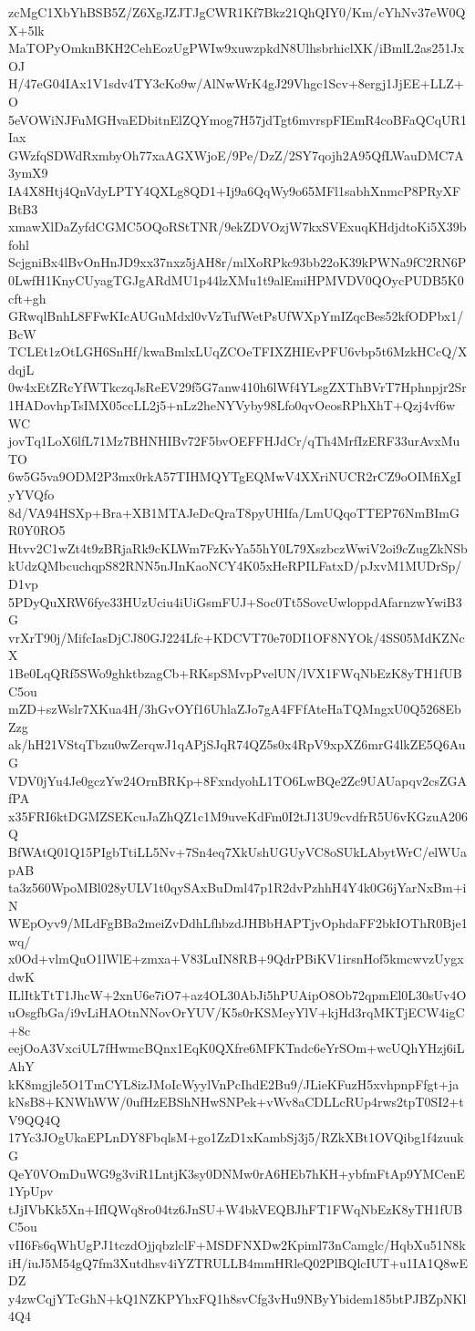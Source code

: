 zcMgC1XbYhBSB5Z/Z6XgJZJTJgCWR1Kf7Bkz21QhQIY0/Km/cYhNv37eW0QX+5lk
MaTOPyOmknBKH2CehEozUgPWIw9xuwzpkdN8UlhsbrhiclXK/iBmlL2as251JxOJ
H/47eG04IAx1V1sdv4TY3cKo9w/AlNwWrK4gJ29Vhgc1Scv+8ergj1JjEE+LLZ+O
5eVOWiNJFuMGHvaEDbitnElZQYmog7H57jdTgt6mvrspFIEmR4coBFaQCqUR1Iax
GWzfqSDWdRxmbyOh77xaAGXWjoE/9Pe/DzZ/2SY7qojh2A95QfLWauDMC7A3ymX9
IA4X8Htj4QnVdyLPTY4QXLg8QD1+Ij9a6QqWy9o65MFl1sabhXnmcP8PRyXFBtB3
xmawXlDaZyfdCGMC5OQoRStTNR/9ekZDVOzjW7kxSVExuqKHdjdtoKi5X39bfohl
ScjgniBx4lBvOnHnJD9xx37nxz5jAH8r/mlXoRPkc93bb22oK39kPWNa9fC2RN6P
0LwfH1KnyCUyagTGJgARdMU1p44lzXMu1t9alEmiHPMVDV0QOycPUDB5K0cft+gh
GRwqlBnhL8FFwKIcAUGuMdxl0vVzTufWetPsUfWXpYmIZqcBes52kfODPbx1/BcW
TCLEt1zOtLGH6SnHf/kwaBmlxLUqZCOeTFIXZHIEvPFU6vbp5t6MzkHCcQ/XdqjL
0w4xEtZRcYfWTkczqJsReEV29f5G7anw410h6lWf4YLsgZXThBVrT7Hphnpjr2Sr
1HADovhpTsIMX05ccLL2j5+nLz2heNYVyby98Lfo0qvOeosRPhXhT+Qzj4vf6wWC
jovTq1LoX6lfL71Mz7BHNHIBv72F5bvOEFFHJdCr/qTh4MrfIzERF33urAvxMuTO
6w5G5va9ODM2P3mx0rkA57TIHMQYTgEQMwV4XXriNUCR2rCZ9oOIMfiXgIyYVQfo
8d/VA94HSXp+Bra+XB1MTAJeDcQraT8pyUHIfa/LmUQqoTTEP76NmBImGR0Y0RO5
Htvv2C1wZt4t9zBRjaRk9cKLWm7FzKvYa55hY0L79XszbczWwiV2oi9cZugZkNSb
kUdzQMbcuchqpS82RNN5nJInKaoNCY4K05xHeRPILFatxD/pJxvM1MUDrSp/D1vp
5PDyQuXRW6fye33HUzUciu4iUiGsmFUJ+Soc0Tt5SovcUwloppdAfarnzwYwiB3G
vrXrT90j/MifcIasDjCJ80GJ224Lfc+KDCVT70e70DI1OF8NYOk/4SS05MdKZNcX
1Be0LqQRf5SWo9ghktbzagCb+RKspSMvpPvelUN/lVX1FWqNbEzK8yTH1fUBC5ou
mZD+szWslr7XKua4H/3hGvOYf16UhlaZJo7gA4FFfAteHaTQMngxU0Q5268EbZzg
ak/hH21VStqTbzu0wZerqwJ1qAPjSJqR74QZ5s0x4RpV9xpXZ6mrG4lkZE5Q6AuG
VDV0jYu4Je0gczYw24OrnBRKp+8FxndyohL1TO6LwBQe2Zc9UAUapqv2csZGAfPA
x35FRI6ktDGMZSEKcuJaZhQZ1c1M9uveKdFm0I2tJ13U9cvdfrR5U6vKGzuA206Q
BfWAtQ01Q15PIgbTtiLL5Nv+7Sn4eq7XkUshUGUyVC8oSUkLAbytWrC/elWUapAB
ta3z560WpoMBl028yULV1t0qySAxBuDml47p1R2dvPzhhH4Y4k0G6jYarNxBm+iN
WEpOyv9/MLdFgBBa2meiZvDdhLfhbzdJHBbHAPTjvOphdaFF2bkIOThR0Bje1wq/
x0Od+vlmQuO1lWlE+zmxa+V83LuIN8RB+9QdrPBiKV1irsnHof5kmcwvzUygxdwK
ILlItkTtT1JhcW+2xnU6e7iO7+az4OL30AbJi5hPUAipO8Ob72qpmEl0L30sUv4O
uOsgfbGa/i9vLiHAOtnNNovOrYUV/K5s0rKSMeyYlV+kjHd3rqMKTjECW4igC+8c
eejOoA3VxciUL7fHwmcBQnx1EqK0QXfre6MFKTndc6eYrSOm+wcUQhYHzj6iLAhY
kK8mgjle5O1TmCYL8izJMoIcWyylVnPcIhdE2Bu9/JLieKFuzH5xvhpnpFfgt+ja
kNsB8+KNWhWW/0ufHzEBShNHwSNPek+vWv8aCDLLcRUp4rws2tpT0SI2+tV9QQ4Q
17Yc3JOgUkaEPLnDY8FbqlsM+go1ZzD1xKambSj3j5/RZkXBt1OVQibg1f4zuukG
QeY0VOmDuWG9g3viR1LntjK3sy0DNMw0rA6HEb7hKH+ybfmFtAp9YMCenE1YpUpv
tJjIVbKk5Xn+IfIQWq8ro04tz6JnSU+W4bkVEQBJhFT1FWqNbEzK8yTH1fUBC5ou
vII6Fs6qWhUgPJ1tczdOjjqbzlclF+MSDFNXDw2Kpiml73nCamglc/HqbXu51N8k
iH/iuJ5M54gQ7fm3Xutdhsv4iYZTRULLB4mmHRleQ02PlBQlcIUT+u1IA1Q8wEDZ
y4zwCqjYTcGhN+kQ1NZKPYhxFQ1h8svCfg3vHu9NByYbidem185btPJBZpNKl4Q4
